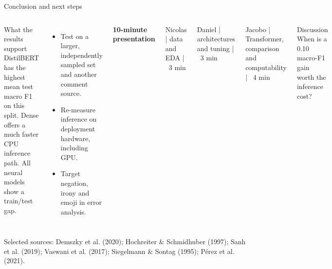 \documentclass[aspectratio=169,10pt]{beamer}
\begin{document}
\begin{frame}{Conclusion and next steps}
\begin{columns}[T,onlytextwidth]
    \begin{block}{What the results support}
      DistilBERT has the highest mean test macro F1 on this split. Dense offers a much faster CPU inference path. All neural models show a train/test gap.
    \end{block}
    \vspace{0.2cm}
    \begin{itemize}
      \item Test on a larger, independently sampled set and another comment source.
      \item Re-measure inference on deployment hardware, including GPU.
      \item Target negation, irony and emoji in error analysis.
    \end{itemize}
    \textbf{10-minute presentation}\par\vspace{0.2cm}
    Nicolas | data and EDA | ~3 min\par
    Daniel | architectures and tuning | ~3 min\par
    Jacobo | Transformer, comparison and computability | ~4 min\par\vspace{0.3cm}
    \begin{alertblock}{Discussion}
      When is a 0.10 macro-F1 gain worth the inference cost?
    \end{alertblock}
\end{columns}
\vfill
{\color{muted}\scriptsize Selected sources: Demszky et al. (2020); Hochreiter \& Schmidhuber (1997); Sanh et al. (2019); Vaswani et al. (2017); Siegelmann \& Sontag (1995); Pérez et al. (2021).}
\end{frame}
\end{document}
